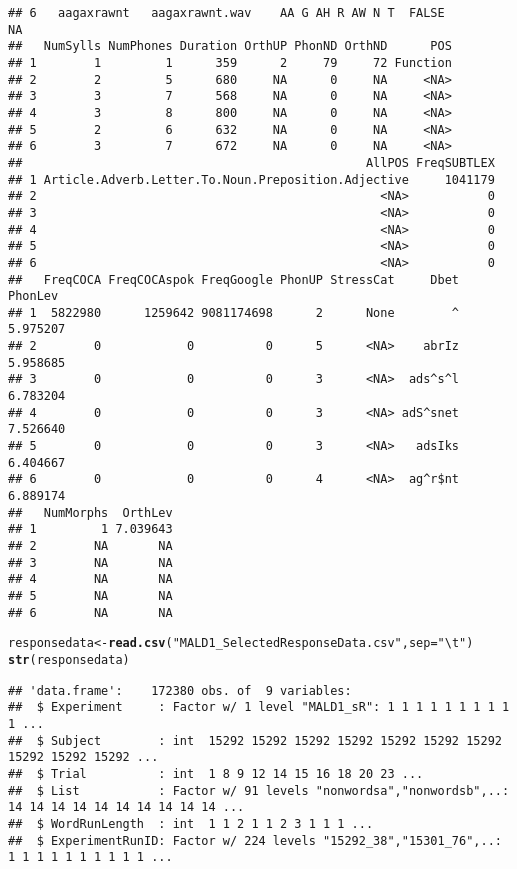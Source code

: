 \documentclass{article}\usepackage[]{graphicx}\usepackage[]{color}
\makeatletter
\newcommand{\hlstr}[1]{\textcolor[rgb]{0.192,0.494,0.8}{#1}}%
\newcommand{\hlstd}[1]{\textcolor[rgb]{0.345,0.345,0.345}{#1}}%
\newcommand{\hlkwb}[1]{\textcolor[rgb]{0.69,0.353,0.396}{#1}}%
\newcommand{\hlkwc}[1]{\textcolor[rgb]{0.333,0.667,0.333}{#1}}%
\newcommand{\hlkwd}[1]{\textcolor[rgb]{0.737,0.353,0.396}{\textbf{#1}}}%
\newenvironment{kframe}{%
 \def\at@end@of@kframe{}%
 \ifinner\ifhmode%
  \def\at@end@of@kframe{\end{minipage}}%
  \begin{minipage}{\columnwidth}%
 \fi\fi%
 \def\FrameCommand##1{\hskip\@totalleftmargin \hskip-\fboxsep
 \colorbox{shadecolor}{##1}\hskip-\fboxsep
     \hskip-\linewidth \hskip-\@totalleftmargin \hskip\columnwidth}%
 \MakeFramed {\advance\hsize-\width
   \@totalleftmargin\z@ \linewidth\hsize
   \@setminipage}}%
 {\par\unskip\endMakeFramed%
 \at@end@of@kframe}
\newenvironment{knitrout}{}{} %
\makeatother
\begin{document}
\begin{knitrout}
\begin{kframe}
\begin{verbatim}
## 6   aagaxrawnt   aagaxrawnt.wav    AA G AH R AW N T  FALSE            NA
##   NumSylls NumPhones Duration OrthUP PhonND OrthND      POS
## 1        1         1      359      2     79     72 Function
## 2        2         5      680     NA      0     NA     <NA>
## 3        3         7      568     NA      0     NA     <NA>
## 4        3         8      800     NA      0     NA     <NA>
## 5        2         6      632     NA      0     NA     <NA>
## 6        3         7      672     NA      0     NA     <NA>
##                                                AllPOS FreqSUBTLEX
## 1 Article.Adverb.Letter.To.Noun.Preposition.Adjective     1041179
## 2                                                <NA>           0
## 3                                                <NA>           0
## 4                                                <NA>           0
## 5                                                <NA>           0
## 6                                                <NA>           0
##   FreqCOCA FreqCOCAspok FreqGoogle PhonUP StressCat     Dbet  PhonLev
## 1  5822980      1259642 9081174698      2      None        ^ 5.975207
## 2        0            0          0      5      <NA>    abrIz 5.958685
## 3        0            0          0      3      <NA>  ads^s^l 6.783204
## 4        0            0          0      3      <NA> adS^snet 7.526640
## 5        0            0          0      3      <NA>   adsIks 6.404667
## 6        0            0          0      4      <NA>  ag^r$nt 6.889174
##   NumMorphs  OrthLev
## 1         1 7.039643
## 2        NA       NA
## 3        NA       NA
## 4        NA       NA
## 5        NA       NA
## 6        NA       NA
\end{verbatim}
\begin{alltt}
\hlstd{responsedata} \hlkwb{<-} \hlkwd{read.csv}\hlstd{(}\hlstr{"MALD1_SelectedResponseData.csv"}\hlstd{,} \hlkwc{sep} \hlstd{=} \hlstr{"\textbackslash{}t"}\hlstd{)}
\hlkwd{str}\hlstd{(responsedata)}
\end{alltt}
\begin{verbatim}
## 'data.frame':	172380 obs. of  9 variables:
##  $ Experiment     : Factor w/ 1 level "MALD1_sR": 1 1 1 1 1 1 1 1 1 1 ...
##  $ Subject        : int  15292 15292 15292 15292 15292 15292 15292 15292 15292 15292 ...
##  $ Trial          : int  1 8 9 12 14 15 16 18 20 23 ...
##  $ List           : Factor w/ 91 levels "nonwordsa","nonwordsb",..: 14 14 14 14 14 14 14 14 14 14 ...
##  $ WordRunLength  : int  1 1 2 1 1 2 3 1 1 1 ...
##  $ ExperimentRunID: Factor w/ 224 levels "15292_38","15301_76",..: 1 1 1 1 1 1 1 1 1 1 ...

\end{verbatim}
\end{kframe}
\end{knitrout}
\end{document}
